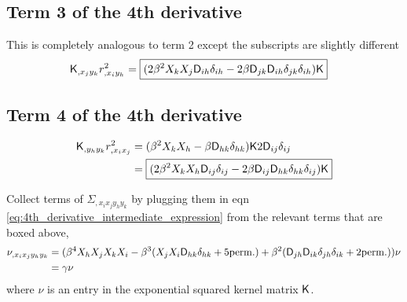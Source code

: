 \subsection{Term 3 of the 4th derivative}
This is completely analogous to term 2 except the subscripts are slightly
different
\begin{align*}
\mathsf{K}_{,x_j y_k} r^2_{,x_i y_h}
&=\boxed { ( 2 \beta^2  X_k X_j \mathsf{D}_{ih} \delta_{ih} 
-2 \beta \mathsf{D}_{jk} \mathsf{D}_{ih} \delta_{jk} \delta_{ih}) \mathsf{K}} 
\end{align*}

\subsection{Term 4 of the 4th derivative} 
\begin{align*}
\mathsf{K}_{,y_h y_k} r^2_{,x_i x_j}
&= (\beta^2 X_k X_h - \beta \mathsf{D}_{hk}\delta_{hk})\mathsf{K} 2 \mathsf{D}_{ij} \delta_{ij}\\ 
&= \boxed{(2\beta^2 X_k X_h \mathsf{D}_{ij} \delta_{ij} - 2\beta \mathsf{D}_{ij} \mathsf{D}_{hk} \delta_{hk}
\delta_{ij})\mathsf{K} } 
\end{align*}

Collect terms of $\Sigma_{,x_i x_j y_h y_k}$ by plugging them in eqn
\ref{eq:4th_derivative_intermediate_expression}
from the relevant terms that are boxed above, 
\begin{align}
\nu_{,x_i x_j y_h y_k} &= (\beta^4 X_h X_j X_k X_i -  
\beta^3 (X_j X_i \mathsf{D}_{hk} \delta_{hk} + 5 {\rm perm.}) + \beta^2
(\mathsf{D}_{jh} \mathsf{D}_{ik}\delta_{jh}\delta_{ik} + 2 {\rm perm.})) \nu \\
&= \gamma \nu
\end{align}
where $\nu$ is an entry in the exponential squared kernel matrix $\mathsf{K}$.
